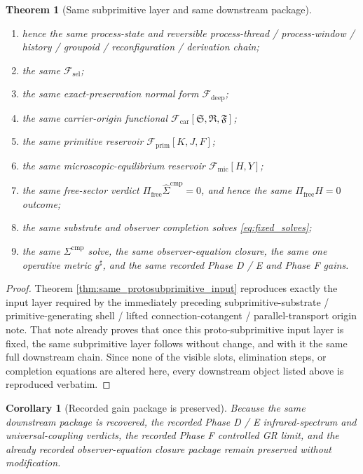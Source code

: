 \documentclass[11pt]{article}
\newcommand{\CompletedMetric}{g^{\sharp}}
\newcommand{\CompLift}{\widehat\Sigma^{\mathrm{cmp}}}
\newcommand{\FreeProj}{\Pi_{\mathrm{free}}}
\newcommand{\GaugeAux}{Y}
\newcommand{\MicFunctional}{\mathscr F_{\mathrm{mic}}}
\newcommand{\PrimFunctional}{\mathscr F_{\mathrm{prim}}}
\newcommand{\CarrierFunctional}{\mathscr F_{\mathrm{car}}}
\newcommand{\DeepFunctional}{\mathscr F_{\mathrm{deep}}}
\newcommand{\StemFunctional}{\mathscr F_{\mathrm{sel}}}
\newcommand{\PrimStrain}{K}
\newcommand{\PrimNeutral}{J}
\newcommand{\PrimFree}{F}
\newcommand{\CarrierSeed}{\mathfrak S}
\newcommand{\RelabelSeed}{\mathfrak R}
\newcommand{\FreeSeed}{\mathfrak F}
\newtheorem{corollary}{Corollary}
\newtheorem{theorem}{Theorem}
\begin{document}
\begin{theorem}[Same subprimitive layer and same downstream package]
\begin{enumerate}
    \item hence the same process-state and reversible process-thread / process-window / history / groupoid / reconfiguration / derivation chain;
    \item the same \(\StemFunctional\);
    \item the same exact-preservation normal form \(\DeepFunctional\);
    \item the same carrier-origin functional \(\CarrierFunctional[\CarrierSeed,\RelabelSeed,\FreeSeed]\);
    \item the same primitive reservoir \(\PrimFunctional[\PrimStrain,\PrimNeutral,\PrimFree]\);
    \item the same microscopic-equilibrium reservoir \(\MicFunctional[H,\GaugeAux]\);
    \item the same free-sector verdict \(\FreeProj\CompLift=0\), and hence the same \(\Pi_{\mathrm{free}}H=0\) outcome;
    \item the same substrate and observer completion solves \eqref{eq:fixed_solves};
    \item the same \(\Sigma^{\mathrm{cmp}}\) solve, the same observer-equation closure, the same one operative metric \(\CompletedMetric\), and the same recorded Phase D / E and Phase F gains.
\end{enumerate}
\end{theorem}

\begin{proof}
Theorem \ref{thm:same_protosubprimitive_input} reproduces exactly the input layer required by the immediately preceding subprimitive-substrate / primitive-generating shell / lifted connection-cotangent / parallel-transport origin note. That note already proves that once this proto-subprimitive input layer is fixed, the same subprimitive layer follows without change, and with it the same full downstream chain. Since none of the visible slots, elimination steps, or completion equations are altered here, every downstream object listed above is reproduced verbatim.
\end{proof}

\begin{corollary}[Recorded gain package is preserved]
\label{cor:gains}
Because the same downstream package is recovered, the recorded Phase D / E infrared-spectrum and universal-coupling verdicts, the recorded Phase F controlled GR limit, and the already recorded observer-equation closure package remain preserved without modification.
\end{corollary}
\end{document}
